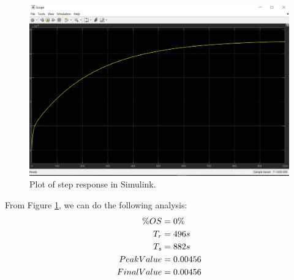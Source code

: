 \documentclass{article}
\begin{document}
\begin{figure}[h!]
	\centering
	\includegraphics[scale=0.5]{images/stepResponse_Simulink.png}
	\caption{Plot of step response in Simulink.}
	\label{fig:stepResponse}
\end{figure}

From Figure \ref{fig:stepResponse}, we can do the following analysis: \\
\begin{equation}\begin{aligned}
\%OS & = 0\%\\
T_r & = 496s\\
T_s & = 882s\\
Peak Value & = 0.00456\\
Final Value & = 0.00456 \end{aligned} \notag \end{equation}


\end{document}
